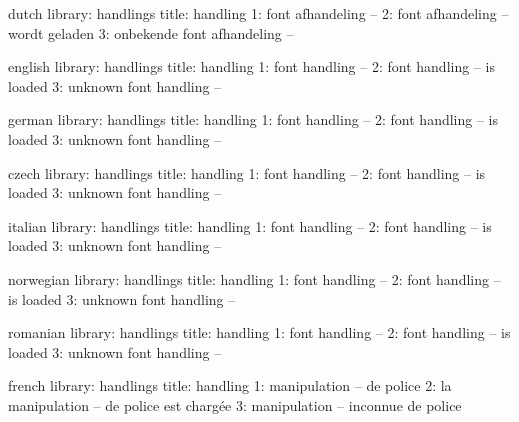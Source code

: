 



\unprotect

\startmessages  dutch  library: handlings
  title: handling
      1: font afhandeling --
      2: font afhandeling -- wordt geladen
      3: onbekende font afhandeling --
\stopmessages

\startmessages  english  library: handlings
  title: handling
      1: font handling --
      2: font handling -- is loaded
      3: unknown font handling --
\stopmessages

\startmessages  german  library: handlings %
  title: handling
      1: font handling --
      2: font handling -- is loaded
      3: unknown font handling --
\stopmessages

\startmessages  czech  library: handlings %
  title: handling
      1: font handling --
      2: font handling -- is loaded
      3: unknown font handling --
\stopmessages

\startmessages  italian  library: handlings %
  title: handling
      1: font handling --
      2: font handling -- is loaded
      3: unknown font handling --
\stopmessages

\startmessages  norwegian  library: handlings %
  title: handling
      1: font handling --
      2: font handling -- is loaded
      3: unknown font handling --
\stopmessages

\startmessages  romanian  library: handlings %
  title: handling
      1: font handling --
      2: font handling -- is loaded
      3: unknown font handling --
\stopmessages

\startmessages  french  library: handlings
  title: handling
      1: manipulation -- de police
      2: la manipulation -- de police est chargée
      3: manipulation -- inconnue de police
\stopmessages

